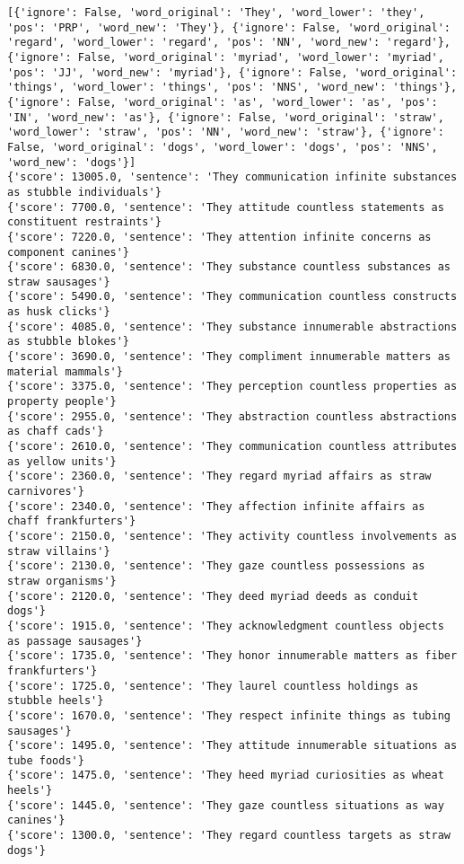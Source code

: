 \documentclass[12pt,a4paper,oneside]{book}
\begin{document}
\begin{verbatim}
[{'ignore': False, 'word_original': 'They', 'word_lower': 'they', 'pos': 'PRP', 'word_new': 'They'}, {'ignore': False, 'word_original': 'regard', 'word_lower': 'regard', 'pos': 'NN', 'word_new': 'regard'}, {'ignore': False, 'word_original': 'myriad', 'word_lower': 'myriad', 'pos': 'JJ', 'word_new': 'myriad'}, {'ignore': False, 'word_original': 'things', 'word_lower': 'things', 'pos': 'NNS', 'word_new': 'things'}, {'ignore': False, 'word_original': 'as', 'word_lower': 'as', 'pos': 'IN', 'word_new': 'as'}, {'ignore': False, 'word_original': 'straw', 'word_lower': 'straw', 'pos': 'NN', 'word_new': 'straw'}, {'ignore': False, 'word_original': 'dogs', 'word_lower': 'dogs', 'pos': 'NNS', 'word_new': 'dogs'}]
{'score': 13005.0, 'sentence': 'They communication infinite substances as stubble individuals'}
{'score': 7700.0, 'sentence': 'They attitude countless statements as constituent restraints'}
{'score': 7220.0, 'sentence': 'They attention infinite concerns as component canines'}
{'score': 6830.0, 'sentence': 'They substance countless substances as straw sausages'}
{'score': 5490.0, 'sentence': 'They communication countless constructs as husk clicks'}
{'score': 4085.0, 'sentence': 'They substance innumerable abstractions as stubble blokes'}
{'score': 3690.0, 'sentence': 'They compliment innumerable matters as material mammals'}
{'score': 3375.0, 'sentence': 'They perception countless properties as property people'}
{'score': 2955.0, 'sentence': 'They abstraction countless abstractions as chaff cads'}
{'score': 2610.0, 'sentence': 'They communication countless attributes as yellow units'}
{'score': 2360.0, 'sentence': 'They regard myriad affairs as straw carnivores'}
{'score': 2340.0, 'sentence': 'They affection infinite affairs as chaff frankfurters'}
{'score': 2150.0, 'sentence': 'They activity countless involvements as straw villains'}
{'score': 2130.0, 'sentence': 'They gaze countless possessions as straw organisms'}
{'score': 2120.0, 'sentence': 'They deed myriad deeds as conduit dogs'}
{'score': 1915.0, 'sentence': 'They acknowledgment countless objects as passage sausages'}
{'score': 1735.0, 'sentence': 'They honor innumerable matters as fiber frankfurters'}
{'score': 1725.0, 'sentence': 'They laurel countless holdings as stubble heels'}
{'score': 1670.0, 'sentence': 'They respect infinite things as tubing sausages'}
{'score': 1495.0, 'sentence': 'They attitude innumerable situations as tube foods'}
{'score': 1475.0, 'sentence': 'They heed myriad curiosities as wheat heels'}
{'score': 1445.0, 'sentence': 'They gaze countless situations as way canines'}
{'score': 1300.0, 'sentence': 'They regard countless targets as straw dogs'}

\end{verbatim}
\end{document}
